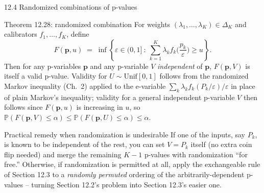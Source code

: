 \documentclass[aspectratio=169,10pt]{beamer}
\newcommand{\PP}{\mathbb{P}}
\newcommand{\bp}{\mathbf{p}}
\begin{document}
\begin{frame}[allowframebreaks]{12.4 Randomized combinations of p-values}
  \begin{block}{Theorem 12.28: randomized combination}
    For weights $(\lambda_1,\dots,\lambda_K)\in\Delta_K$ and calibrators $f_1,\dots,f_K$, define
    \[
      F(\bp,u) \;=\; \inf\left\{\varepsilon\in(0,1]\ :\ \sum_{k=1}^K\lambda_kf_k\Big(\frac{p_k}\varepsilon\Big)\ge u\right\}.
    \]
    Then for any p-variables $\bp$ and any p-variable $V$ \emph{independent} of $\bp$, $F(\bp,V)$ is itself a valid p-value. Validity for $U\sim\mathrm{Unif}[0,1]$ follows from the randomized Markov inequality (Ch.\ 2) applied to the e-variable $\sum_k\lambda_kf_k(P_k/\varepsilon)/\varepsilon$ in place of plain Markov's inequality; validity for a general independent p-variable $V$ then follows since $F(\bp,u)$ is increasing in $u$, so $\PP(F(\bp,V)\le\alpha)\le\PP(F(\bp,U)\le\alpha)\le\alpha$.
  \end{block}

  \begin{block}{Practical remedy when randomization is undesirable}
    If one of the inputs, say $P_k$, is known to be independent of the rest, you can set $V=P_k$ itself (no extra coin flip needed) and merge the remaining $K-1$ p-values with randomization ``for free.'' Otherwise, if randomization is permitted at all, apply the exchangeable rule of Section 12.3 to a \emph{randomly permuted} ordering of the arbitrarily-dependent p-values -- turning Section 12.2's problem into Section 12.3's easier one.
  \end{block}

  \framebreak


\end{frame}
\end{document}
